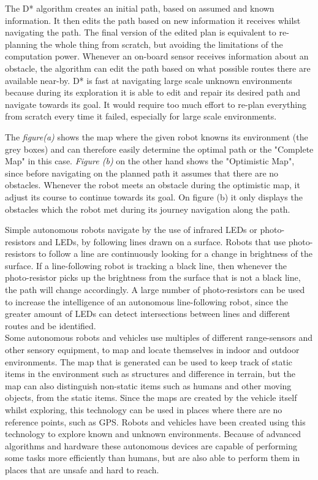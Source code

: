 The D* algorithm creates an initial path, based on assumed and known information. It then edits the path based on new information it receives whilst navigating the path. The final version of the edited plan is equivalent to re-planning the whole thing from scratch, but avoiding the limitations of the computation power.
Whenever an on-board sensor receives information about an obstacle, the algorithm can edit the path based on what possible routes there are available near-by.
D* is fast at navigating large scale unknown environments because during its exploration it is able to edit and repair its desired path and navigate towards its goal. It would require too much effort to re-plan everything from scratch every time it failed, especially for large scale environments\cite{dstar}\cite{moredstar}.

The \textit{figure(a)} shows the map where the given robot knowns its environment (the grey boxes) and can therefore easily determine the optimal path or the "Complete Map" in this case. \textit{Figure (b)} on the other hand shows the "Optimistic Map", since before navigating on the planned path it assumes that there are no obstacles. Whenever the robot meets an obstacle during the optimistic map, it adjust its course to continue towards its goal. On figure (b) it only displays the obstacles which the robot met during its journey navigation along the path.

Simple autonomous robots navigate by the use of infrared LEDs or photo-resistors and LEDs, by following lines drawn on a surface. Robots that use photo-resistors to follow a line are continuously looking for a change in brightness of the surface. If a line-following robot is tracking a black line, then whenever the photo-resistor picks up the brightness from the surface that is not a black line, the path will change accordingly. A large number of photo-resistors can be used to increase the intelligence of an autonomous line-following robot, since the greater amount of LEDs can detect intersections between lines and different routes and be identified\cite{linetrack}.\\
Some autonomous robots and vehicles use multiples of different range-sensors and other sensory equipment, to map and locate themselves in indoor and outdoor environments. The map that is generated can be used to keep track of static items in the environment such as structures and difference in terrain, but the map can also distinguish non-static items such as humans and other moving objects, from the static items. Since the maps are created by the vehicle itself whilst exploring, this technology can be used in places where there are no reference points, such as GPS\cite{rangesens}\cite{rangesensarc}. Robots and vehicles have been created using this technology to explore known and unknown environments. Because of advanced algorithms and hardware these autonomous devices are capable of performing some tasks more efficiently than humans, but are also able to perform them in places that are unsafe and hard to reach. %

